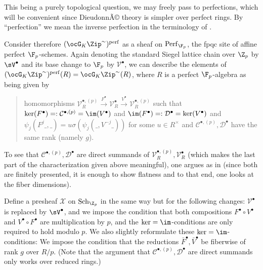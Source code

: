 \documentclass[a4paper]{scrartcl} %
\numberwithin{equation}{section}
\begin{document}
\begin{Proof}
  This being a purely topological question, we may freely pass to perfections, which will be convenient since DieudonnÃ© theory is simpler over perfect rings. By ``perfection'' we mean the inverse perfection in the terminology of \cite[Section~5]{perfection}.

  Consider therefore $(\ocG_K\Zip^{\sim})^\mathrm{perf}$ as a sheaf on $\mathrm{Perf}_{\F_p}$, the fpqc site of affine perfect $\F_p$-schemes. Again denoting the standard Siegel lattice chain over $\Z_p$ by $\sV^\bullet$ and its base change to $\F_p$ by $\mathcal{V}^\bullet$, we can describe the elements of $(\ocG_K\Zip^{\sim})^\mathrm{perf}(R)=\ocG_K\Zip^{\sim}(R)$, where $R$ is a perfect $\F_p$-algebra as being given by
  \begin{quote}
    homomorphisms $\mathcal{V}_R^{\bullet,(p)} \xrightarrow{F^\bullet} \mathcal{V}_R^\bullet \xrightarrow{V^\bullet} \mathcal{V}_R^{\bullet,(p)}$ such that $\ker(F^\bullet)=:\mathcal{C}^{\bullet,(p)}=\im(V^\bullet)$ and $\im(F^\bullet)=:\mathcal{D}^\bullet=\ker(V^\bullet)$ and $\psi_j(F^j\_,\_)=u\sigma(\psi_j(\_,V^{-j}\_))$ for some $u\in R^\times$ and $\mathcal{C}^{\bullet,(p)},\mathcal{D}^\bullet$ have the same rank (namely $g$).
  \end{quote}
  To see that $\mathcal{C}^{\bullet,(p)},\mathcal{D}^\bullet$ are direct summands of $\mathcal{V}_R^{\bullet,(p)},\mathcal{V}_R^\bullet$ (which makes the last part of the characterization given above meaningful), one argues as in \cite[Lemma~2.4]{laurel} (since both are finitely presented, it is enough to show flatness and to that end, one looks at the fiber dimensions).

  Define a presheaf $\mathcal{X}$ on $\mathrm{Sch}_{\Z_p}$ in the same way but for the following changes: $\mathcal{V}^\bullet$ is replaced by $\sV^\bullet$, and we impose the condition that both compositions $F^\bullet\circ V^\bullet$ and $V^\bullet\circ F^\bullet$ are multiplication by $p$, and the $\ker=\im$-conditions are only required to hold modulo $p$. We also slightly reformulate these $\ker=\im$-conditions: We impose the condition that the  reductions $\bar F^\bullet,\bar V^\bullet$ be fiberwise of rank $g$ over $R/p$. (Note that the argument that $\mathcal{C}^{\bullet,(p)},\mathcal{D}^\bullet$ are direct summands only works over reduced rings.)


\end{Proof}
\end{document}
